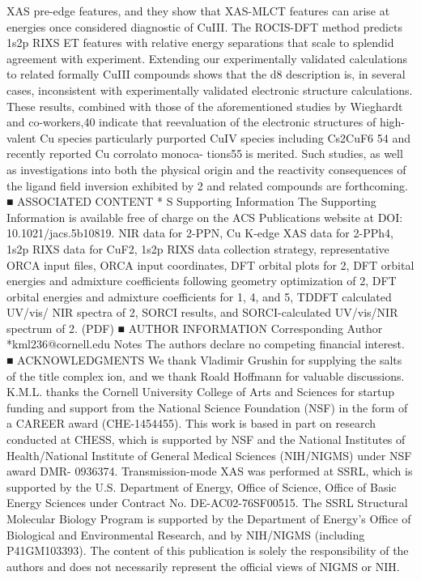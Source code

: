 XAS pre-edge features, and they show that XAS-MLCT features
can arise at energies once considered diagnostic of CuIII. The
ROCIS-DFT method predicts 1s2p RIXS ET features with
relative energy separations that scale to splendid agreement
with experiment. Extending our experimentally validated
calculations to related formally CuIII compounds shows that
the d8 description is, in several cases, inconsistent with
experimentally validated electronic structure calculations.
These results, combined with those of the aforementioned
studies by Wieghardt and co-workers,40 indicate that
reevaluation of the electronic structures of high-valent Cu
speciesparticularly purported CuIV species including
Cs2CuF6
54 and recently reported Cu corrolato monoca-
tions55is merited. Such studies, as well as investigations
into both the physical origin and the reactivity consequences of
the ligand ﬁeld inversion exhibited by 2 and related compounds
are forthcoming.
■ ASSOCIATED CONTENT
*
S
Supporting Information
The Supporting Information is available free of charge on the
ACS Publications website at DOI: 10.1021/jacs.5b10819.
NIR data for 2-PPN, Cu K-edge XAS data for 2-PPh4,
1s2p RIXS data for CuF2, 1s2p RIXS data collection
strategy, representative ORCA input ﬁles, ORCA input
coordinates, DFT orbital plots for 2, DFT orbital
energies and admixture coeﬃcients following geometry
optimization of 2, DFT orbital energies and admixture
coeﬃcients for 1, 4, and 5, TDDFT calculated UV/vis/
NIR spectra of 2, SORCI results, and SORCI-calculated
UV/vis/NIR spectrum of 2. (PDF)
■ AUTHOR INFORMATION
Corresponding Author
*kml236@cornell.edu
Notes
The authors declare no competing ﬁnancial interest.
■ ACKNOWLEDGMENTS
We thank Vladimir Grushin for supplying the salts of the title
complex ion, and we thank Roald Hoﬀmann for valuable
discussions. K.M.L. thanks the Cornell University College of
Arts and Sciences for startup funding and support from the
National Science Foundation (NSF) in the form of a CAREER
award (CHE-1454455). This work is based in part on research
conducted at CHESS, which is supported by NSF and the
National Institutes of Health/National Institute of General
Medical Sciences (NIH/NIGMS) under NSF award DMR-
0936374. Transmission-mode XAS was performed at SSRL,
which is supported by the U.S. Department of Energy, Oﬃce of
Science, Oﬃce of Basic Energy Sciences under Contract No.
DE-AC02-76SF00515. The SSRL Structural Molecular Biology
Program is supported by the Department of Energy’s Oﬃce of
Biological and Environmental Research, and by NIH/NIGMS
(including P41GM103393). The content of this publication is
solely the responsibility of the authors and does not necessarily
represent the oﬃcial views of NIGMS or NIH.



